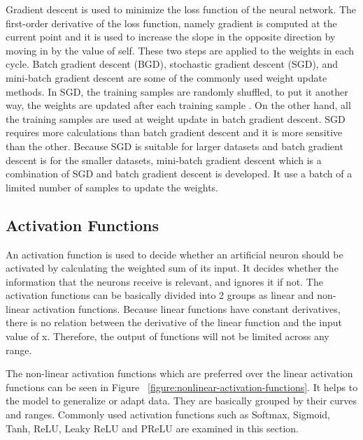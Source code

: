         Gradient descent is used to minimize the loss function of the neural network.
        The first-order derivative of the loss function, namely gradient is computed at the current point and it is used to increase the slope in the opposite direction by moving in by the value of self.
        These two steps are applied to the weights in each cycle.
        Batch gradient descent (BGD), stochastic gradient descent (SGD), and mini-batch gradient descent are some of the commonly used weight update methods.
        In SGD, the training samples are randomly shuffled, to put it another way, the weights are updated after each training sample \cite{bottou2010large}.
        On the other hand, all the training samples are used at weight update in batch gradient descent.
        SGD requires more calculations than batch gradient descent and it is more sensitive than the other.
        Because SGD is suitable for larger datasets and batch gradient descent is for the smaller datasets, mini-batch gradient descent which is a combination of SGD and batch gradient descent is developed.
        It use a batch of a limited number of samples to update the weights.

    \subsection{Activation Functions}

        An activation function is used to decide whether an artificial neuron should be activated by calculating the weighted sum of its input.
        It decides whether the information that the neurons receive is relevant, and ignores it if not.
        The activation functions can be basically divided into 2 groups as linear and non-linear activation functions.
        Because linear functions have constant derivatives, there is no relation between the derivative of the linear function and the input value of x.
        Therefore, the output of functions will not be limited across any range.

        

        The non-linear activation functions which are preferred over the linear activation functions can be seen in Figure ~\ref{figure:nonlinear-activation-functions}.
        It helps to the model to generalize or adapt data. They are basically grouped by their curves and ranges.
        Commonly used activation functions such as Softmax, Sigmoid, Tanh, ReLU, Leaky ReLU and PReLU are examined in this section.

